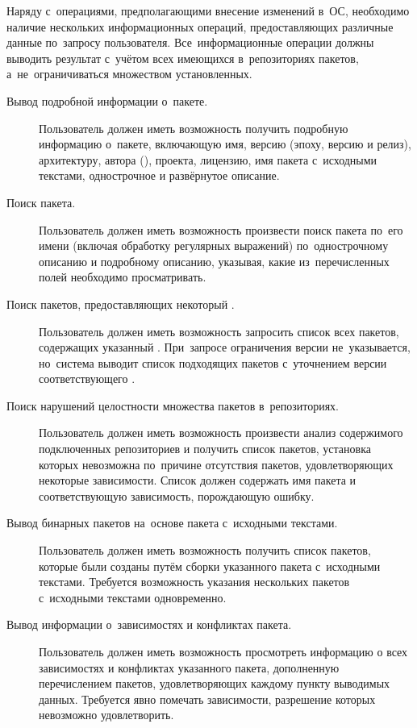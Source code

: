 Наряду с~операциями, предполагающими внесение изменений в~ОС,
необходимо наличие нескольких информационных операций,
предоставляющих различные данные по~запросу пользователя.
Все~информационные операции должны выводить результат с~учётом всех имеющихся в~репозиториях пакетов,
а~не~ограничиваться множеством установленных.

\begin{description}

\item[Вывод подробной информации о~пакете.]
Пользователь должен иметь возможность получить подробную информацию о~пакете,
включающую имя, версию (эпоху, версию и релиз), архитектуру, автора (),  проекта,
лицензию, имя пакета с~исходными текстами, однострочное и развёрнутое описание.

\item[Поиск пакета.]
Пользователь должен иметь возможность произвести поиск пакета по~его имени (включая обработку регулярных выражений)
по~однострочному описанию и подробному описанию, указывая, какие из~перечисленных полей необходимо просматривать.

\item[Поиск пакетов, предоставляющих некоторый .]
Пользователь должен иметь возможность запросить список всех пакетов,
содержащих указанный .
При~запросе ограничения версии не~указывается,
но~система выводит список подходящих пакетов с~уточнением версии соответствующего .

\item[Поиск нарушений целостности множества пакетов в~репозиториях.]
Пользователь должен иметь возможность произвести анализ содержимого подключенных репозиториев и получить список пакетов,
установка которых невозможна по~причине отсутствия пакетов, удовлетворяющих некоторые зависимости.
Список должен содержать имя пакета и соответствующую зависимость, порождающую ошибку.

\item[Вывод бинарных пакетов на~основе пакета с~исходными текстами.]
Пользователь должен иметь возможность получить список пакетов,
которые были созданы путём сборки указанного пакета с~исходными текстами.
Требуется возможность указания нескольких пакетов с~исходными текстами одновременно.

\item[Вывод информации о~зависимостях и конфликтах пакета.]
Пользователь должен иметь возможность просмотреть информацию 
о всех зависимостях и конфликтах указанного пакета, дополненную перечислением пакетов, удовлетворяющих каждому пункту выводимых данных.
Требуется явно помечать зависимости, разрешение которых невозможно удовлетворить.


\end{description}

